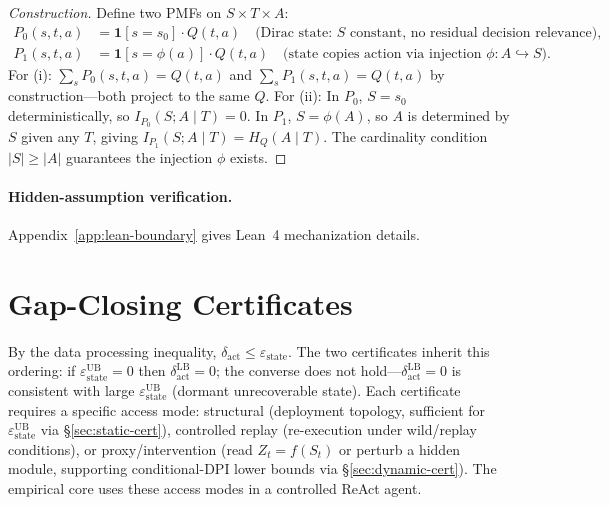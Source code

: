 \documentclass{article}
\begin{document}
\begin{proof}[Construction]
Define two PMFs on $S \times T \times A$:
\begin{align*}
  P_0(s,t,a) &= \mathbf{1}[s = s_0] \cdot Q(t,a) \quad \text{(Dirac state: $S$ constant, no residual decision relevance)}, \\
  P_1(s,t,a) &= \mathbf{1}[s = \phi(a)] \cdot Q(t,a) \quad \text{(state copies action via injection $\phi : A \hookrightarrow S$)}.
\end{align*}
For (i): $\sum_s P_0(s,t,a) = Q(t,a)$ and $\sum_s P_1(s,t,a) = Q(t,a)$ by construction---both project to the same $Q$. For (ii): In $P_0$, $S = s_0$ deterministically, so $I_{P_0}(S; A \mid T) = 0$. In $P_1$, $S = \phi(A)$, so $A$ is determined by $S$ given any $T$, giving $I_{P_1}(S; A \mid T) = H_Q(A \mid T)$. The cardinality condition $|S| \geq |A|$ guarantees the injection $\phi$ exists.
\end{proof}

\paragraph{Hidden-assumption verification.} Appendix~\ref{app:lean-boundary} gives Lean~4 mechanization details.

\section{Gap-Closing Certificates}
\label{sec:gap-closers}

By the data processing inequality, $\delta_\text{act} \leq \varepsilon_\text{state}$. The two certificates inherit this ordering: if $\varepsilon_\text{state}^\text{UB} = 0$ then $\delta_\text{act}^\text{LB} = 0$; the converse does not hold---$\delta_\text{act}^\text{LB} = 0$ is consistent with large $\varepsilon_\text{state}^\text{UB}$ (dormant unrecoverable state). Each certificate requires a specific access mode: structural (deployment topology, sufficient for $\varepsilon_\text{state}^\text{UB}$ via \S\ref{sec:static-cert}), controlled replay (re-execution under wild/replay conditions), or proxy/intervention (read $Z_t=f(S_t)$ or perturb a hidden module, supporting conditional-DPI lower bounds via \S\ref{sec:dynamic-cert}). The empirical core uses these access modes in a controlled ReAct agent.

\end{document}
